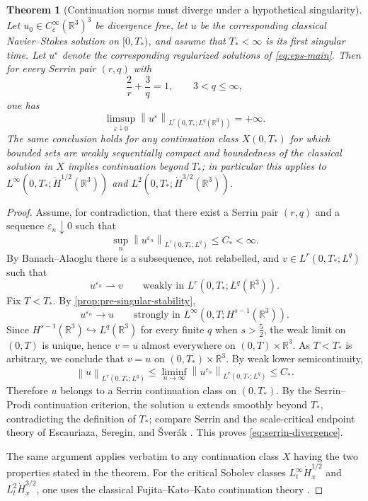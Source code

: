 \documentclass[11pt]{article}
\newtheorem{theorem}{Theorem}[section]
\theoremstyle{definition}
\theoremstyle{remark}
\newcommand{\R}{\mathbb{R}}
\newcommand{\norm}[1]{\left\lVert #1\right\rVert}
\begin{document}
\begin{theorem}[Continuation norms must diverge under a hypothetical singularity]\label{thm:continuation-blowup}
Let $u_0\in C_c^\infty(\R^3)^3$ be divergence free, let $u$ be the corresponding classical Navier--Stokes solution on $[0,T_*)$, and assume that $T_*<\infty$ is its first singular time. Let $u^\varepsilon$ denote the corresponding regularized solutions of \eqref{eq:eps-main}. Then for every Serrin pair $(r,q)$ with
\[
\frac{2}{r}+\frac{3}{q}=1,
\qquad 3<q\le \infty,
\]
one has
\begin{equation}\label{eq:serrin-divergence}
\limsup_{\varepsilon\downarrow0}\norm{u^\varepsilon}_{L^r(0,T_*;L^q(\R^3))}=+\infty.
\end{equation}
The same conclusion holds for any continuation class $X(0,T_*)$ for which bounded sets are weakly sequentially compact and boundedness of the classical solution in $X$ implies continuation beyond $T_*$; in particular this applies to $L^\infty(0,T_*;\dot H^{1/2}(\R^3))$ and $L^2(0,T_*;\dot H^{3/2}(\R^3))$.
\end{theorem}

\begin{proof}
Assume, for contradiction, that there exist a Serrin pair $(r,q)$ and a sequence $\varepsilon_n\downarrow0$ such that
\begin{equation}\label{eq:uniform-serrin-assumption}
\sup_n \norm{u^{\varepsilon_n}}_{L^r(0,T_*;L^q)}\le C_*<\infty.
\end{equation}
By Banach--Alaoglu there is a subsequence, not relabelled, and $v\in L^r(0,T_*;L^q)$ such that
\[
u^{\varepsilon_n}\rightharpoonup v\qquad\text{weakly in }L^r(0,T_*;L^q(\R^3)).
\]
Fix $T<T_*$. By \cref{prop:pre-singular-stability},
\[
u^{\varepsilon_n}\to u\qquad\text{strongly in }L^\infty(0,T;H^{s-1}(\R^3)).
\]
Since $H^{s-1}(\R^3)\hookrightarrow L^q(\R^3)$ for every finite $q$ when $s>\frac52$, the weak limit on $(0,T)$ is unique, hence $v=u$ almost everywhere on $(0,T)\times\R^3$. As $T<T_*$ is arbitrary, we conclude that $v=u$ on $(0,T_*)\times\R^3$. By weak lower semicontinuity,
\[
\norm{u}_{L^r(0,T_*;L^q)}
\le \liminf_{n\to\infty}\norm{u^{\varepsilon_n}}_{L^r(0,T_*;L^q)}
\le C_*.
\]
Therefore $u$ belongs to a Serrin continuation class on $(0,T_*)$. By the Serrin--Prodi continuation criterion, the solution $u$ extends smoothly beyond $T_*$, contradicting the definition of $T_*$; compare Serrin \cite{Serrin1962} and the scale-critical endpoint theory of Escauriaza, Seregin, and \v Sver\'ak \cite{EscauriazaSereginSverak2003}. This proves \eqref{eq:serrin-divergence}.

The same argument applies verbatim to any continuation class $X$ having the two properties stated in the theorem. For the critical Sobolev classes $L^\infty_t\dot H^{1/2}_x$ and $L^2_t\dot H^{3/2}_x$, one uses the classical Fujita--Kato--Kato continuation theory \cite{FujitaKato1964,Kato1984}.
\end{proof}
\end{document}
